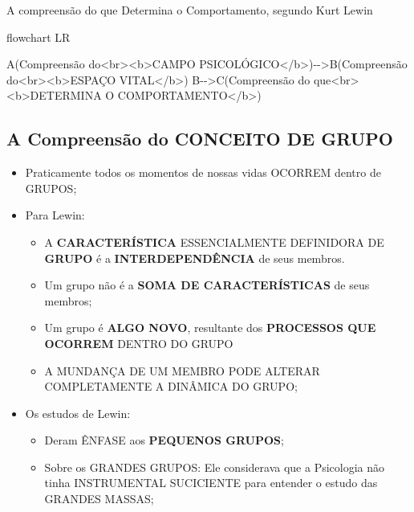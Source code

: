 \documentclass[
]{book}
\newenvironment{Shaded}{\begin{snugshade}}{\end{snugshade}}
\newcommand{\NormalTok}[1]{#1}
\providecommand{\tightlist}{%
  \setlength{\itemsep}{0pt}\setlength{\parskip}{0pt}}
\begin{document}
A compreensão do que Determina o Comportamento, segundo Kurt Lewin

\begin{Shaded}
\begin{Highlighting}[]
\NormalTok{flowchart LR}

\NormalTok{A(Compreensão do\textless{}br\textgreater{}\textless{}b\textgreater{}CAMPO PSICOLÓGICO\textless{}/b\textgreater{}){-}{-}\textgreater{}B(Compreensão do\textless{}br\textgreater{}\textless{}b\textgreater{}ESPAÇO VITAL\textless{}/b\textgreater{})}
\NormalTok{B{-}{-}\textgreater{}C(Compreensão do que\textless{}br\textgreater{}\textless{}b\textgreater{}DETERMINA O COMPORTAMENTO\textless{}/b\textgreater{})}
\end{Highlighting}
\end{Shaded}

\hypertarget{a-compreensuxe3o-do-conceito-de-grupo}{%
\subsection{A Compreensão do CONCEITO DE GRUPO}\label{a-compreensuxe3o-do-conceito-de-grupo}}

\begin{itemize}
\tightlist
\item
  Praticamente todos os momentos de nossas vidas OCORREM dentro de GRUPOS;
\item
  Para Lewin:

  \begin{itemize}
  \tightlist
  \item
    A \textbf{CARACTERÍSTICA} ESSENCIALMENTE DEFINIDORA DE \textbf{GRUPO } é a \textbf{INTERDEPENDÊNCIA} de seus membros.
  \item
    Um grupo não é a \textbf{SOMA DE CARACTERÍSTICAS} de seus membros;
  \item
    Um grupo é \textbf{ALGO NOVO}, resultante dos \textbf{PROCESSOS QUE OCORREM} DENTRO DO GRUPO
  \item
    A MUNDANÇA DE UM MEMBRO PODE ALTERAR COMPLETAMENTE A DINÂMICA DO GRUPO;
  \end{itemize}
\item
  Os estudos de Lewin:

  \begin{itemize}
  \tightlist
  \item
    Deram ÊNFASE aos \textbf{PEQUENOS GRUPOS};
  \item
    Sobre os GRANDES GRUPOS: Ele considerava que a Psicologia não tinha INSTRUMENTAL SUCICIENTE para entender o estudo das GRANDES MASSAS;
  \end{itemize}
\end{itemize}
\end{document}
